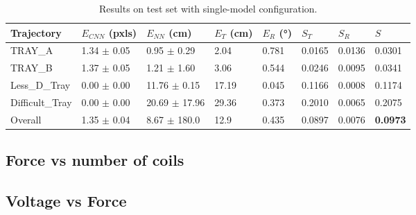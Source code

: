 \begin{table}[H]
\label{tab:single-model test results}
\centering
\begin{tabular}{l | l l l l | l l | l}
\toprule
Trajectory & $E_{CNN}$ (pxls) & $E_{NN}$ (cm) & $E_T$ (cm)& $E_R$ (°)& $S_T$ & $S_R$ & $S$\\
\midrule
TRAY\_A & 1.34 $\pm$ 0.05 & 0.95 $\pm$ 0.29 & 2.04 & 0.781 & 0.0165 & 0.0136 & 0.0301\\
TRAY\_B & 1.37 $\pm$ 0.05 & 1.21 $\pm$ 1.60 & 3.06 & 0.544 & 0.0246 & 0.0095 & 0.0341\\
Less\_D\_Tray & 0.00 $\pm$ 0.00 & 11.76 $\pm$ 0.15 & 17.19 & 0.045 & 0.1166 & 0.0008 & 0.1174\\
Difficult\_Tray & 0.00 $\pm$ 0.00 & 20.69 $\pm$ 17.96 & 29.36 & 0.373 & 0.2010 & 0.0065 & 0.2075\\
\midrule
Overall & 1.35 $\pm$ 0.04 & 8.67 $\pm$ 180.0 & 12.9 & 0.435 & 0.0897 & 0.0076 & \textbf{0.0973}\\
\bottomrule
\end{tabular}
\caption{Results on test set with single-model configuration.}
\end{table}


\subsection{Force vs number of coils}


\subsection{Voltage vs Force}